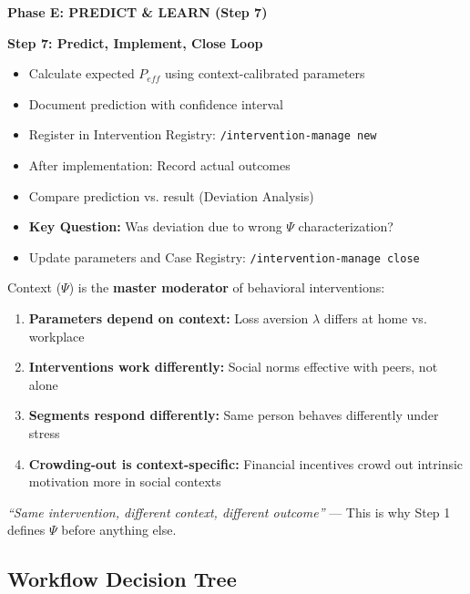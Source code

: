 \begin{tcolorbox}[colback=blue!5!white,colframe=blue!75!black,
    title=\textbf{7-Step Workflow: Context $\to$ Model $\to$ Portfolio $\to$ Learn}]
\vspace{1em}
\textbf{Phase E: PREDICT \& LEARN (Step 7)}

\textbf{Step 7: Predict, Implement, Close Loop}
\begin{itemize}[noitemsep]
    \item Calculate expected $P_{eff}$ using context-calibrated parameters
    \item Document prediction with confidence interval
    \item Register in Intervention Registry: \texttt{/intervention-manage new}
    \item After implementation: Record actual outcomes
    \item Compare prediction vs. result (Deviation Analysis)
    \item \textbf{Key Question:} Was deviation due to wrong $\Psi$ characterization?
    \item Update parameters and Case Registry: \texttt{/intervention-manage close}
\end{itemize}

\end{tcolorbox}

\begin{tcolorbox}[colback=green!5!white,colframe=green!75!black,
    title=\textbf{Why Context First?}]
\small
Context ($\Psi$) is the \textbf{master moderator} of behavioral interventions:

\begin{enumerate}[noitemsep]
    \item \textbf{Parameters depend on context:} Loss aversion $\lambda$ differs at home vs. workplace
    \item \textbf{Interventions work differently:} Social norms effective with peers, not alone
    \item \textbf{Segments respond differently:} Same person behaves differently under stress
    \item \textbf{Crowding-out is context-specific:} Financial incentives crowd out intrinsic motivation more in social contexts
\end{enumerate}

\textit{``Same intervention, different context, different outcome''} --- This is why Step 1 defines $\Psi$ before anything else.
\end{tcolorbox}

\subsection{Workflow Decision Tree}
\label{sec:25-decision-tree}

